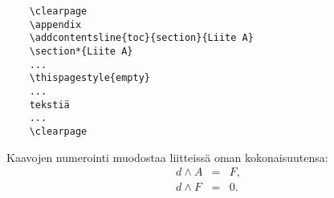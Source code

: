 \documentclass[english,12pt,a4paper,dvips]{article}
\begin{document}
\begin{verbatim}
	\clearpage
	\appendix
	\addcontentsline{toc}{section}{Liite A}
	\section*{Liite A}
	...
	\thispagestyle{empty}
	...
	tekstiä
	...
	\clearpage
\end{verbatim}

Kaavojen numerointi muodostaa liitteissä oman kokonaisuutensa:
\begin{eqnarray}
d \wedge A  &=& F, \label{liitekaava1}\\
d \wedge F  &=& 0. \label{liitekaava2}
\end{eqnarray}
\end{document}
